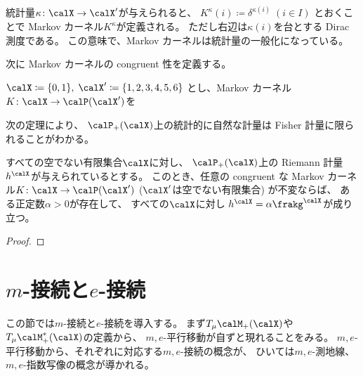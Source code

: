 \documentclass[report]{jlreq}
\begin{document}
統計量$\kappa \colon \calX \to \calX'$が与えられると、
$K^{\kappa}(i) \coloneqq \delta^{\kappa(i)} \; (i \in I)$
とおくことで Markov カーネル$K^{\kappa}$が定義される。
ただし右辺は$\kappa(i)$を台とする Dirac 測度である。
この意味で、Markov カーネルは統計量の一般化になっている。

次に Markov カーネルの congruent 性を定義する。

\begin{definition}
    \TODO{}
\end{definition}

\begin{example}
    $\calX \coloneqq \{ 0, 1 \}, \;
        \calX' \coloneqq \{ 1, 2, 3, 4, 5, 6 \}$
    とし、Markov カーネル$K \colon \calX \to \calP(\calX')$を
    \TODO{}
\end{example}

次の定理により、
$\calP_+(\calX)$上の統計的に自然な計量は
Fisher 計量に限られることがわかる。

\begin{theorem}
    すべての空でない有限集合$\calX$に対し、
    $\calP_+(\calX)$上の Riemann 計量$h^\calX$が与えられているとする。
    このとき、任意の congruent な
    Markov カーネル$K \colon \calX \to \calP(\calX')$
    ($\calX'$は空でない有限集合)
    が不変ならば、
    ある正定数$\alpha > 0$が存在して、
    すべての$\calX$に対し
    $h^\calX = \alpha \frakg^\calX$が成り立つ。
\end{theorem}

\begin{proof}
    \TODO{}
\end{proof}

%
\section{$m$-接続と$e$-接続}

この節では$m$-接続と$e$-接続を導入する。
まず$T_\mu \calM_+(\calX)$や$T_\mu \calM_+^*(\calX)$の定義から、
$m, e$-平行移動が自ずと現れることをみる。
$m, e$-平行移動から、それぞれに対応する$m, e$-接続の概念が、
ひいては$m, e$-測地線、$m, e$-指数写像の概念が導かれる。


\begin{definition}[$m, e$-平行移動]
    \TODO{}
\end{definition}
\end{document}
